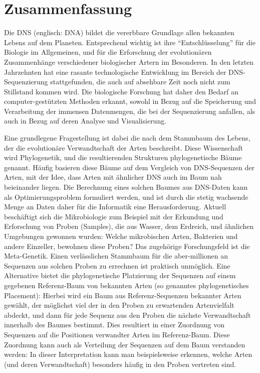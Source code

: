 \section*{Zusammenfassung}
\vspace*{1em}

Die DNS (englisch: DNA) bildet die vererbbare Grundlage allen bekannten Lebens auf dem Planeten.
Entsprechend wichtig ist ihre ``Entschl\"usselung'' f\"ur die Biologie im Allgemeinen,
und f\"ur die Erforschung der evolution\"aren Zusammenh\"ange verschiedener biologischer Artern im Besonderen.
In den letzten Jahrzehnten hat eine rasante technologische Entwicklung im Bereich der DNS-Sequenzierung stattgefunden,
die auch auf absehbare Zeit noch nicht zum Stillstand kommen wird.
Die biologische Forschung hat daher den Bedarf an computer-gest\"utzten Methoden erkannt,
sowohl in Bezug auf die Speicherung und Verarbeitung der immensen Datenmengen, die bei der Sequenzierung anfallen,
als auch in Bezug auf deren Analyse und Visualisierung.

Eine grundlegene Fragestellung ist dabei die nach dem Stammbaum des Lebens,
der die evolution\"are Verwandtschaft der Arten beschreibt.
Diese Wissenschaft wird Phylogenetik, und die resultierenden Strukturen phylogenetische B\"aume genannt.
H\"aufig basieren diese B\"aume auf dem Vergleich von DNS-Sequenzen der Arten,
mit der Idee, dass Arten mit \"ahnlicher DNS auch im Baum nah beieinander liegen.
Die Berechnung eines solchen Baumes aus DNS-Daten kann als Optimierungsproblem formuliert werden,
und ist durch die stetig wachsende Menge an Daten daher f\"ur die Informatik eine Herausforderung.
Aktuell besch\"aftigt sich die Mikrobiologie zum Beispiel mit der Erkundung und Erforschung von Proben (Samples),
die aus Wasser, dem Erdreich, und \"ahnlichen Umgebungen gewonnen wurden:
Welche mikrobischen Arten, Bakterien und andere Einzeller, bewohnen diese Proben?
Das zugeh\"orige Forschungsfeld ist die Meta-Genetik.
Einen verl\"asslichen Stammbaum f\"ur die aber-millionen an Sequenzen aus solchen Proben zu errechnen
ist praktisch unm\"oglich.
Eine Alternative bietet die phylogenetische Platzierung der Sequenzen auf einem gegebenen Referenz-Baum von bekannten Arten
(so genanntes phylogenetisches Placement):
Hierbei wird ein Baum aus Referenz-Sequenzen bekannter Arten gew\"ahlt,
der m\"oglichst viel der in den Proben zu erwartenden Artenvielfalt abdeckt,
und dann f\"ur jede Sequenz aus den Proben die n\"achste Verwandtschaft innerhalb des Baumes bestimmt.
Dies resultiert in einer Zuordnung von Sequenzen auf die Positionen verwandter Arten im Referenz-Baum.
Diese Zuordnung kann auch als Verteilung der Sequenzen auf dem Baum verstanden werden:
In dieser Interpretation kann man beispielsweise erkennen,
welche Arten (und deren Verwandtschaft) besonders h\"aufig in den Proben vertreten sind.

